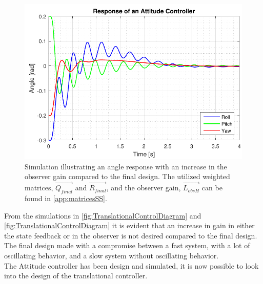 \begin{figure}[H]
	\centering
	\includegraphics[scale=0.8]{figures/ssEqObsHigh.pdf}
	\caption{Simulation illustrating an angle response with an increase in the observer gain compared to the final design. The utilized weighted matrices, $\vec{Q_{final}}$ and $\vec{R_{final}}$, and the observer gain, $\vec{L_{obsH}}$ can be found in \autoref{app:matricesSS}.}
	\label{fig:TranslationalControlDiagram}
\end{figure}
%
From the simulations in \autoref{fig:TranslationalControlDiagram} and \autoref{fig:TranslationalControlDiagram} it is evident that an increase in gain in either the state feedback or in the observer is not desired compared to the final design.\\ The final design made with a compromise between a fast system, with a lot of oscillating behavior, and a slow system without oscillating behavior. \\ The Attitude controller has been design and simulated, it is now possible to look into the design of the translational controller.


